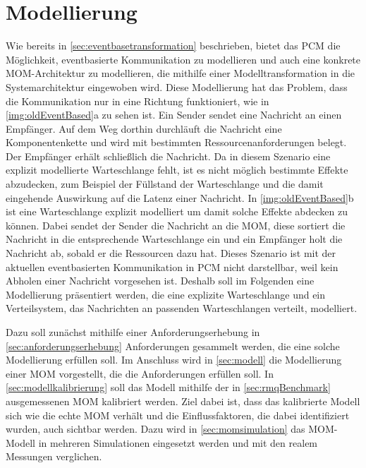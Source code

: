 
\chapter{Modellierung}
\label{ch:modellierung}
Wie bereits in \autoref{sec:eventbasetransformation} beschrieben, bietet das PCM die Möglichkeit, eventbasierte Kommunikation zu modellieren und auch eine konkrete MOM-Architektur zu modellieren, die mithilfe einer Modelltransformation in die Systemarchitektur eingewoben wird. Diese Modellierung hat das Problem, dass die Kommunikation nur in eine Richtung funktioniert, wie in \autoref{img:oldEventBased}a zu sehen ist. Ein Sender sendet eine Nachricht an einen Empfänger. Auf dem Weg dorthin durchläuft die Nachricht eine Komponentenkette und wird mit bestimmten Ressourcenanforderungen belegt. Der Empfänger erhält schließlich die Nachricht. Da in diesem Szenario eine explizit modellierte Warteschlange fehlt, ist es nicht möglich bestimmte Effekte abzudecken, zum Beispiel der Füllstand der Warteschlange und die damit eingehende Auswirkung auf die Latenz einer Nachricht. In \autoref{img:oldEventBased}b ist eine Warteschlange explizit modelliert um damit solche Effekte abdecken zu können. Dabei sendet der Sender die Nachricht an die MOM, diese sortiert die Nachricht in die entsprechende Warteschlange ein und ein Empfänger holt die Nachricht ab, sobald er die Ressourcen dazu hat. Dieses Szenario ist mit der aktuellen eventbasierten Kommunikation in PCM nicht darstellbar, weil kein Abholen einer Nachricht vorgesehen ist. Deshalb soll im Folgenden eine Modellierung präsentiert werden, die eine explizite Warteschlange und ein Verteilsystem, das Nachrichten an passenden Warteschlangen verteilt, modelliert.\par
Dazu soll zunächst mithilfe einer Anforderungserhebung in \autoref{sec:anforderungserhebung} Anforderungen gesammelt werden, die eine solche Modellierung erfüllen soll. Im Anschluss wird in \autoref{sec:modell} die Modellierung einer MOM vorgestellt, die die Anforderungen erfüllen soll. In \autoref{sec:modellkalibrierung} soll das Modell mithilfe der in \autoref{sec:rmqBenchmark} ausgemessenen MOM kalibriert werden. Ziel dabei ist, dass das kalibrierte Modell sich wie die echte MOM verhält und die Einflussfaktoren, die dabei identifiziert wurden, auch sichtbar werden. Dazu wird in \autoref{sec:momsimulation} das MOM-Modell in mehreren Simulationen eingesetzt werden und mit den realem Messungen verglichen. 
